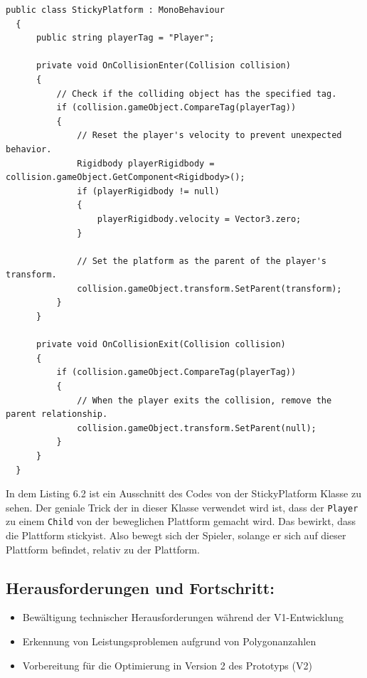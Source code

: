 \begin{lstlisting}[language=CSharp,caption={StickyPlatform Klasse.},label=code:mainmenu]
  public class StickyPlatform : MonoBehaviour
  {
      public string playerTag = "Player";
  
      private void OnCollisionEnter(Collision collision)
      {
          // Check if the colliding object has the specified tag.
          if (collision.gameObject.CompareTag(playerTag))
          {
              // Reset the player's velocity to prevent unexpected behavior.
              Rigidbody playerRigidbody = collision.gameObject.GetComponent<Rigidbody>();
              if (playerRigidbody != null)
              {
                  playerRigidbody.velocity = Vector3.zero;
              }
  
              // Set the platform as the parent of the player's transform.
              collision.gameObject.transform.SetParent(transform);
          }
      }
  
      private void OnCollisionExit(Collision collision)
      {
          if (collision.gameObject.CompareTag(playerTag))
          {
              // When the player exits the collision, remove the parent relationship.
              collision.gameObject.transform.SetParent(null);
          }
      }
  }
\end{lstlisting}

In dem Listing 6.2 ist ein Ausschnitt des Codes von der StickyPlatform Klasse zu sehen. Der geniale Trick der in dieser Klasse verwendet wird ist, dass der \verb+Player+ zu einem \verb+Child+ von der beweglichen Plattform gemacht wird. Das bewirkt, dass die Plattform \glqq sticky\grqq ist. Also bewegt sich der Spieler, solange er sich auf dieser Plattform befindet, relativ zu der Plattform.

\pagebreak

\subsection{Herausforderungen und Fortschritt:}
\begin{itemize}
  \item Bewältigung technischer Herausforderungen während der V1-Entwicklung
  \item Erkennung von Leistungsproblemen aufgrund von Polygonanzahlen
  \item Vorbereitung für die Optimierung in Version 2 des Prototyps (V2)
\end{itemize}


